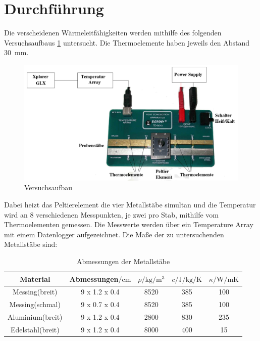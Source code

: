 \section{Durchführung}
\label{sec:Durchführung}
Die verscheidenen Wärmeleitfähigkeiten werden mithilfe des folgenden Versuchsaufbaus \ref{fig:aufbau}
untersucht. Die Thermoelemente haben jeweils den Abstand \SI{30}{\milli\meter}.
\begin{figure}
    \centering
    \includegraphics[width=\textwidth]{content/aufbau.png}
    \caption{Versuchsaufbau\cite{v204}}
    \label{fig:aufbau}
\end{figure}
Dabei heizt das Peltierelement die vier Metallstäbe simultan und die Temperatur wird an 8
verschiedenen Messpunkten, je zwei pro Stab, mithilfe vom Thermoelementen gemessen. Die
Messwerte werden über ein Temperature Array mit einem Datenlogger aufgezeichnet.
Die Maße der zu untersuchenden Metallstäbe sind:
\begin{table}
    \centering
    \caption{Abmessungen der Metallstäbe \cite{v204}}
    \label{tab:werte}
    \begin{tabular}{c c S S S}
        \toprule
        {Material} & {Abmessungen$/\si{\centi\meter}$} &{$\rho/\si{\kg\per\meter\cubed}$} &{$c/\si{\joule\per\kg\per\kelvin}$} &{$\kappa/\si{\watt\per\meter\kelvin}$} \\
        \midrule
        Messing(breit) & 9 x 1.2 x 0.4 & 8520 & 385 & 100 \\
        Messing(schmal) & 9 x 0.7 x 0.4 & 8520 & 385 & 100 \\
        Aluminium(breit) & 9 x 1.2 x 0.4 & 2800 & 830 & 235 \\
        Edelstahl(breit) & 9 x 1.2 x 0.4 & 8000 & 400 & 15 \\
        \bottomrule
    \end{tabular}
\end{table}
%
